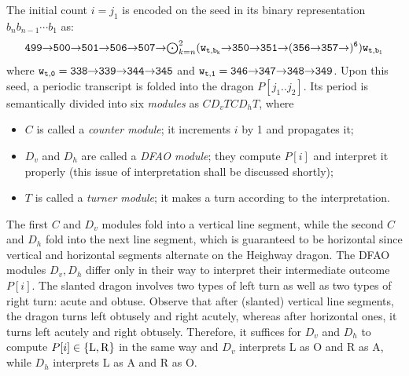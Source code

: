 \documentclass[runningheads]{llncs}
\newcommand{\east}{{\ensuremath \to}}
\newcommand{\se}{{\ensuremath \searrow}}
\begin{document}
The initial count $i = j_1$ is encoded on the seed in its binary representation $b_n b_{n-1} \cdots b_1$ as: 
\begin{equation}\label{eq:turner_output}
	{\tt 499 \east 500 \east 501 \east 506 \east 507 \east \mbox{$\bigodot_{k = n}^2$} (w_{t, b_k} \east 350 \east 351 \east (356 \east 357 \east)^6) w_{t, b_1}} 
\end{equation}
where ${\tt w_{t, 0} = 338 \east 339 \east 344 \east 345}$ and ${\tt w_{t, 1} = 346 \east 347 \east 348 \east 349}$. 
Upon this seed, a periodic transcript is folded into the dragon $P[j_1..j_2]$. 
Its period is semantically divided into six \textit{modules} as $C D_v T C D_h T$, where 
\begin{itemize}
\item $C$ is called a \textit{counter module}; it increments $i$ by 1 and propagates it; 
\item $D_v$ and $D_h$ are called a \textit{DFAO module}; they compute $P[i]$ and interpret it properly (this issue of interpretation shall be discussed shortly); 
\item $T$ is called a \textit{turner module}; it makes a turn according to the interpretation. 
\end{itemize}
The first $C$ and $D_v$ modules fold into a vertical line segment, while the second $C$ and $D_h$ fold into the next line segment, which is guaranteed to be horizontal since vertical and horizontal segments alternate on the Heighway dragon. 
The DFAO modules $D_v, D_h$ differ only in their way to interpret their intermediate outcome $P[i]$. 
The slanted dragon involves two types of left turn as well as two types of right turn: acute and obtuse. 
Observe that after (slanted) vertical line segments, the dragon turns left obtusely and right acutely, whereas after horizontal ones, it turns left acutely and right obtusely. 
Therefore, it suffices for $D_v$ and $D_h$ to compute $P[i] \in \{{\rm L}, {\rm R}\}$ in the same way and $D_v$ interprets L as O and R as A, while $D_h$ interprets L as A and R as O. 
\end{document}

